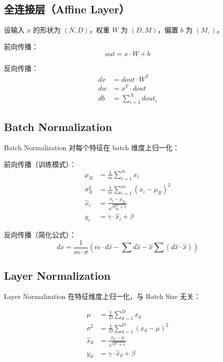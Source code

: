 \documentclass[a4paper]{article}
\begin{document}
\subsection{全连接层（Affine Layer）}

设输入 $x$ 的形状为 $(N, D)$，权重 $W$ 为 $(D, M)$，偏置 $b$ 为 $(M,)$。

前向传播：
\begin{equation}
out = x \cdot W + b
\end{equation}

反向传播：
\begin{align}
dx &= dout \cdot W^T \\
dw &= x^T \cdot dout \\
db &= \sum_{i=1}^{N} dout_i
\end{align}

\subsection{Batch Normalization}

Batch Normalization 对每个特征在 batch 维度上归一化：

前向传播（训练模式）：
\begin{align}
\mu_B &= \frac{1}{m}\sum_{i=1}^{m} x_i \\
\sigma_B^2 &= \frac{1}{m}\sum_{i=1}^{m} (x_i - \mu_B)^2 \\
\hat{x}_i &= \frac{x_i - \mu_B}{\sqrt{\sigma_B^2 + \epsilon}} \\
y_i &= \gamma \cdot \hat{x}_i + \beta
\end{align}

反向传播（简化公式）：
\begin{equation}
dx = \frac{1}{m \cdot \sigma} \left( m \cdot d\hat{x} - \sum d\hat{x} - \hat{x} \sum (d\hat{x} \cdot \hat{x}) \right)
\end{equation}

\subsection{Layer Normalization}

Layer Normalization 在特征维度上归一化，与 Batch Size 无关：

\begin{align}
\mu &= \frac{1}{D}\sum_{d=1}^{D} x_d \\
\sigma^2 &= \frac{1}{D}\sum_{d=1}^{D} (x_d - \mu)^2 \\
\hat{x}_d &= \frac{x_d - \mu}{\sqrt{\sigma^2 + \epsilon}} \\
y_d &= \gamma \cdot \hat{x}_d + \beta
\end{align}
\end{document}
